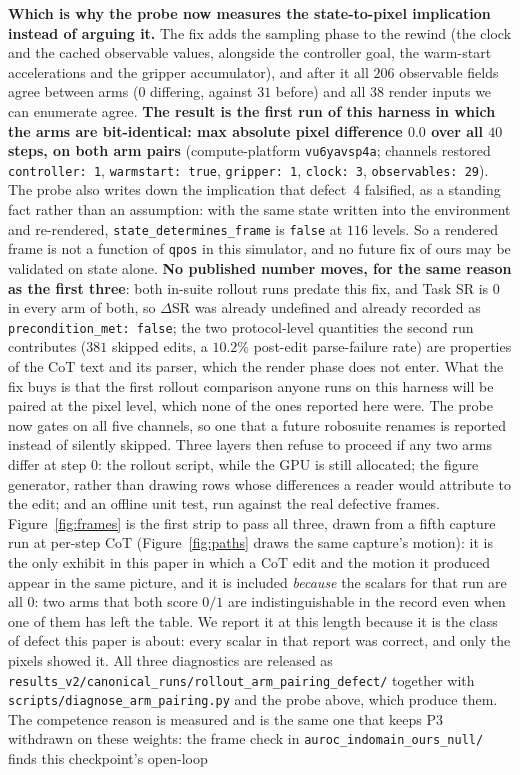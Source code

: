 \documentclass{article}
\begin{document}
\textbf{Which is why the probe now measures the state-to-pixel implication instead of arguing it.} The fix adds the sampling phase to the rewind (the clock and the cached observable values, alongside the controller goal, the warm-start accelerations and the gripper accumulator), and after it all $206$ observable fields agree between arms ($0$ differing, against $31$ before) and all $38$ render inputs we can enumerate agree. \textbf{The result is the first run of this harness in which the arms are bit-identical: max absolute pixel difference $0.0$ over all $40$ steps, on both arm pairs} (compute-platform \texttt{vu6yavsp4a}; channels restored \texttt{controller:\ 1}, \texttt{warmstart:\ true}, \texttt{gripper:\ 1}, \texttt{clock:\ 3}, \texttt{observables:\ 29}). The probe also writes down the implication that defect~4 falsified, as a standing fact rather than an assumption: with the same state written into the environment and re-rendered, \texttt{state\_determines\_frame} is \texttt{false} at $116$ levels. So a rendered frame is not a function of \texttt{qpos} in this simulator, and no future fix of ours may be validated on state alone. \textbf{No published number moves, for the same reason as the first three}: both in-suite rollout runs predate this fix, and Task SR is $0$ in every arm of both, so $\Delta$SR was already undefined and already recorded as \texttt{precondition\_met:\ false}; the two protocol-level quantities the second run contributes ($381$ skipped edits, a $10.2\%$ post-edit parse-failure rate) are properties of the CoT text and its parser, which the render phase does not enter. What the fix buys is that the first rollout comparison anyone runs on this harness will be paired at the pixel level, which none of the ones reported here were. The probe now gates on all five channels, so one that a future robosuite renames is reported instead of silently skipped. Three layers then refuse to proceed if any two arms differ at step $0$: the rollout script, while the GPU is still allocated; the figure generator, rather than drawing rows whose differences a reader would attribute to the edit; and an offline unit test, run against the real defective frames. Figure~\ref{fig:frames} is the first strip to pass all three, drawn from a fifth capture run at per-step CoT (Figure~\ref{fig:paths} draws the same capture's motion): it is the only exhibit in this paper in which a CoT edit and the motion it produced appear in the same picture, and it is included \emph{because} the scalars for that run are all $0$: two arms that both score $0/1$ are indistinguishable in the record even when one of them has left the table. We report it at this length because it is the class of defect this paper is about: every scalar in that report was correct, and only the pixels showed it. All three diagnostics are released as \texttt{results\_\allowbreak{}v2/\allowbreak{}canonical\_\allowbreak{}runs/\allowbreak{}rollout\_\allowbreak{}arm\_\allowbreak{}pairing\_\allowbreak{}defect/} together with \texttt{scripts/\allowbreak{}diagnose\_\allowbreak{}arm\_\allowbreak{}pairing.py} and the probe above, which produce them. The competence reason is measured and is the same one that keeps P3 withdrawn on these weights: the frame check in \texttt{auroc\_indomain\_ours\_null/} finds this checkpoint's open-loop 
\end{document}
